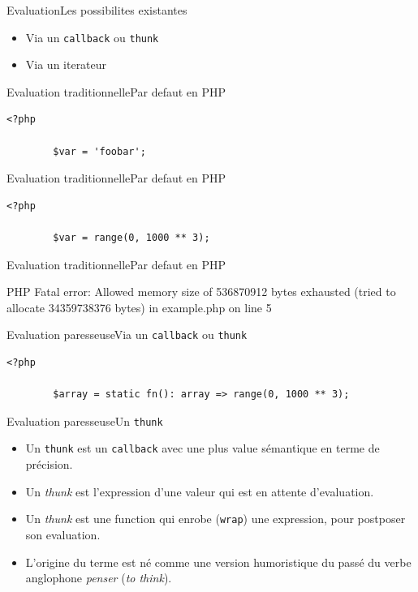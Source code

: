 \begin{frame}{Evaluation}{Les possibilites existantes}
    \begin{itemize}[<+->]
        \item Via un \texttt{callback} ou \texttt{thunk}
        \item Via un iterateur
    \end{itemize}
\end{frame}

\begin{frame}[fragile]{Evaluation traditionnelle}{Par defaut en PHP}
    \begin{lstlisting}[firstnumber=1]
        <?php

        $var = 'foobar';
    \end{lstlisting}
\end{frame}

\begin{frame}[fragile]{Evaluation traditionnelle}{Par defaut en PHP}
    \begin{lstlisting}[firstnumber=1]
        <?php

        $var = range(0, 1000 ** 3);
    \end{lstlisting}
\end{frame}

\begin{frame}[fragile]{Evaluation traditionnelle}{Par defaut en PHP}
    \begin{spverbatim}
        PHP Fatal error: Allowed memory size of 536870912 bytes exhausted (tried to allocate 34359738376 bytes) in example.php on line 5
    \end{spverbatim}
\end{frame}

\begin{frame}[fragile]{Evaluation paresseuse}{Via un \texttt{callback} ou \texttt{thunk}}
    \begin{lstlisting}[firstnumber=1]
        <?php

        $array = static fn(): array => range(0, 1000 ** 3);
    \end{lstlisting}
\end{frame}

\begin{frame}{Evaluation paresseuse}{Un \texttt{thunk}}
    \begin{itemize}[<+->]
        \item Un \texttt{thunk} est un \texttt{callback} avec une plus value
        sémantique en terme de précision.
        \item Un \textit{thunk} est l'expression d'une valeur qui est en attente
        d'evaluation.
        \item Un \textit{thunk} est une function qui enrobe (\texttt{wrap}) une
        expression, pour postposer son evaluation.
        \item L'origine du terme est né comme une version humoristique du passé
        du verbe anglophone \textit{penser} (\textit{to think}).
    \end{itemize}
\end{frame}

